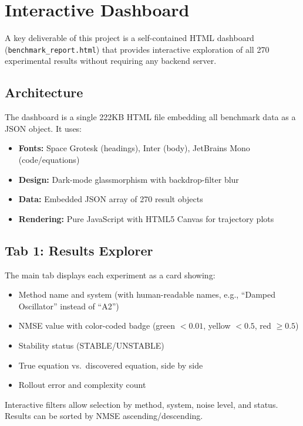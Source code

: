 \section{Interactive Dashboard}
\label{sec:dashboard}

A key deliverable of this project is a self-contained HTML dashboard (\texttt{benchmark\_report.html}) that provides interactive exploration of all 270 experimental results without requiring any backend server.

\subsection{Architecture}
The dashboard is a single 222KB HTML file embedding all benchmark data as a JSON object. It uses:
\begin{itemize}
    \item \textbf{Fonts:} Space Grotesk (headings), Inter (body), JetBrains Mono (code/equations)
    \item \textbf{Design:} Dark-mode glassmorphism with backdrop-filter blur
    \item \textbf{Data:} Embedded JSON array of 270 result objects
    \item \textbf{Rendering:} Pure JavaScript with HTML5 Canvas for trajectory plots
\end{itemize}

\subsection{Tab 1: Results Explorer}
The main tab displays each experiment as a card showing:
\begin{itemize}
    \item Method name and system (with human-readable names, e.g., ``Damped Oscillator'' instead of ``A2'')
    \item NMSE value with color-coded badge (green $< 0.01$, yellow $< 0.5$, red $\geq 0.5$)
    \item Stability status (STABLE/UNSTABLE)
    \item True equation vs.\ discovered equation, side by side
    \item Rollout error and complexity count
\end{itemize}
Interactive filters allow selection by method, system, noise level, and status. Results can be sorted by NMSE ascending/descending.

